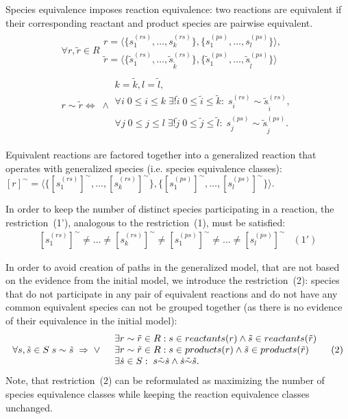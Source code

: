 \documentclass[9pt]{article}
\newcounter{rm}
\begin{document}
Species equivalence imposes reaction equivalence: two reactions are equivalent if their corresponding reactant and product species are pairwise equivalent.
\[ \begin{array}{l}
\mbox{$\forall r, \tilde{r} \in R $} \begin{array}{c}
	\mbox{$r = \langle\{s^{(rs)}_1, \ldots, s^{(rs)}_k\},\{s^{(ps)}_1, \ldots, s^{(ps)}_l\}\rangle,$}\\
	\mbox{$\tilde{r} = \langle\{\tilde{s}^{(rs)}_1, \ldots, \tilde{s}^{(rs)}_{\tilde{k}}\},\{\tilde{s}^{(ps)}_1, \ldots, \tilde{s}^{(ps)}_{\tilde{l}}\}\rangle$}
\end{array}\\ 
\mbox{$r \sim \tilde{r} \iff \; \land$} \begin{array}{l}
	\mbox{$k = \tilde{k}, l = \tilde{l}$}, \\
	\mbox{$\forall i\; 0\leq{i}\leq{k} \; \exists{!} \tilde{i}\; 0\leq \tilde{i}\leq \tilde{k}:\; s^{(rs)}_i \sim \tilde{s}^{(rs)}_{\tilde{i}}$}, \\
	\mbox{$\forall j\;0\leq j\leq l\;\exists{!} \tilde{j}\;0\leq \tilde{j}\leq\tilde{l}:\;s^{(ps)}_j \sim \tilde{s}^{(ps)}_{\tilde{j}}$}.
\end{array}	 
\end{array} \]

Equivalent reactions are factored together into a generalized reaction that operates with generalized species (i.e. species equivalence classes): 
$[r]^{\sim} = \langle\{[s^{(rs)}_1]^{\sim}, \ldots, [s^{(rs)}_k]^{\sim}\}, \{[s^{(ps)}_1]^{\sim}, \ldots, [s^{(ps)}_l]^{\sim}\}\rangle$.

In order to keep the number of distinct species participating in a reaction, the restriction~(1'), analogous to the restriction~(1), must be satisfied:
\[ \begin{array}{lr}
\mbox{$[s^{(rs)}_1]^{\sim} \neq \ldots \neq [s^{(rs)}_k]^{\sim} \neq [s^{(ps)}_1]^{\sim} \neq \ldots \neq [s^{(ps)}_l]^{\sim}$} & (1')
\end{array} \]

In order to avoid creation of paths in the generalized model, that are not based on the evidence from the initial model, we introduce the restriction~(2): species that do not participate in any pair of equivalent reactions and do not have any common equivalent species can not be grouped together (as there is no evidence of their equivalence in the initial model):
\[ \begin{array}{clr}
\mbox{$\forall s, \tilde{s} \in S\; s \sim \tilde{s} \;\Rightarrow\;\lor$} & 
\begin{array}{l}
	\mbox{$\exists r \sim \tilde{r} \in R: s \in reactants(r) \land \tilde{s} \in reactants(\tilde{r})$} \\
	\mbox{$\exists r \sim \tilde{r} \in R: s \in products(r) \land \tilde{s} \in products(\tilde{r})$} \\
	\mbox{$ \exists \dot{s} \in S:\; s \tilde{\sim} \dot{s} \land \dot{s} \tilde{\sim} \tilde{s}$}.
\end{array} & (2)
\end{array} \]
Note, that restriction~(2) can be reformulated as maximizing the number of species equivalence classes while keeping the reaction equivalence classes unchanged. 
\end{document}
